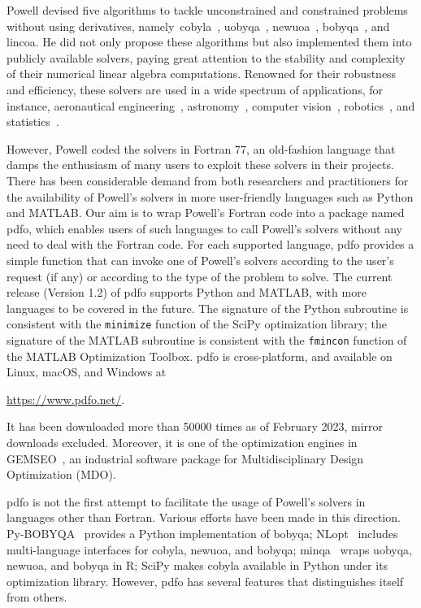 \documentclass[
    smallextended,  %
    final,          %
]{svjour3}
\begin{document}
Powell devised five algorithms to tackle unconstrained and constrained problems without using derivatives, namely~\gls{cobyla}~\cite{Powell_1994}, \gls{uobyqa}~\cite{Powell_2002}, \gls{newuoa}~\cite{Powell_2006}, \gls{bobyqa}~\cite{Powell_2009}, and \gls{lincoa}.
He did not only propose these algorithms but also implemented them into publicly available solvers, paying great attention to the stability and complexity of their numerical linear algebra computations.
Renowned for their robustness and efficiency, these solvers are used in a wide spectrum of applications, for instance, aeronautical engineering~\cite{Gallard_Etal_2018}, astronomy~\cite{Mamon_Biviano_Boue_2013}, computer vision~\cite{Izadinia_Shan_Seitz_2017}, robotics~\cite{Mombaur_Truong_Laumond_2010}, and statistics~\cite{Bates_Etal_2014}.

However, Powell coded the solvers in Fortran 77, an old-fashion language that damps the enthusiasm of many users to exploit these solvers in their projects.
There has been considerable demand from both researchers and practitioners for the availability of Powell's solvers in more user-friendly languages such as Python and MATLAB.
Our aim is to wrap Powell's Fortran code into a package named \gls{pdfo}, which enables users of such languages to call Powell's solvers without any need to deal with the Fortran code.
For each supported language, \gls{pdfo} provides a simple function that can invoke one of Powell's solvers according to the user's request (if any) or according to the type of the problem to solve.
The current release (Version 1.2) of \gls{pdfo} supports Python and MATLAB, with more languages to be covered in the future.
The signature of the Python subroutine is consistent with the \texttt{minimize} function of the SciPy optimization library; the signature of the MATLAB subroutine is consistent with the \texttt{fmincon} function of the MATLAB Optimization Toolbox.
\gls{pdfo} is cross-platform, and available on Linux, macOS, and Windows at
\begin{center}
    \url{https://www.pdfo.net/}.
\end{center}
It has been downloaded more than \num{50000} times as of February 2023, mirror downloads excluded.
Moreover, it is one of the optimization engines in GEMSEO~\cite{Gallard_Etal_2018},
an industrial software package for Multidisciplinary Design Optimization (MDO).

\gls{pdfo} is not the first attempt to facilitate the usage of Powell's solvers in languages other than Fortran.
Various efforts have been made in this direction.
Py-BOBYQA~\cite{Cartis_Etal_2019,Cartis_Roberts_Sheridan-Methven_2022} provides a Python implementation of \gls{bobyqa}; NLopt~\cite{Johnson_2019} includes multi-language interfaces for \gls{cobyla}, \gls{newuoa}, and \gls{bobyqa}; minqa~\cite{Bates_Etal_2014} wraps \gls{uobyqa}, \gls{newuoa}, and \gls{bobyqa} in R; SciPy makes \gls{cobyla} available in Python under its optimization library.
However, \gls{pdfo} has several features that distinguishes itself from others.
\end{document}
